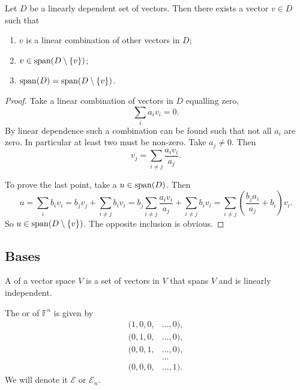 \begin{lemma}
Let $D$ be a linearly dependent set of vectors. Then there exists a vector $v\in D$ such that
\begin{enumerate}
\item $v$ is a linear combination of other vectors in $D$;
\item $v\in \operatorname{span}(D\setminus\{v\})$;
\item $\operatorname{span}(D) = \operatorname{span}(D\setminus\{v\})$.
\end{enumerate}
\label{lemma:linearDependence}
\end{lemma}
\begin{proof}
Take a linear combination of vectors in $D$ equalling zero,
\[ \sum_i a_iv_i = 0. \]
By linear dependence such a combination can be found such that not all $a_i$ are zero. In particular at least two must be non-zero. Take $a_j\neq 0$. Then
\[ v_j = \sum_{i\neq j}\frac{a_iv_i}{a_j}. \]

To prove the last point, take a $u\in \operatorname{span}(D)$. Then
\[ u = \sum_i b_iv_i = b_j v_j + \sum_{i\neq j} b_iv_i = b_j\sum_{i\neq j}\frac{a_iv_i}{a_j} + \sum_{i\neq j} b_iv_i = \sum_{i\neq j}\left(\frac{b_ja_i}{a_j}+b_i\right)v_i.  \]
So $u\in \operatorname{span}(D\setminus\{v\})$. The opposite inclusion is obvious. 
\end{proof}

\subsection{Bases}
\begin{definition}
A  of a vector space $V$ is a set of vectors in $V$ that spans $V$ and is linearly independent.
\end{definition}
\begin{example}
The  or  of $\mathbb{F}^n$ is given by
\begin{align*}
(1,0,0,&\ldots,0), \\
(0,1,0,&\ldots,0), \\
(0,0,1,&\ldots,0), \\
&\ldots \\
(0,0,0,&\ldots,1).
\end{align*}
We will denote it $\mathcal{E}$ or $\mathcal{E}_n$.
\end{example}
